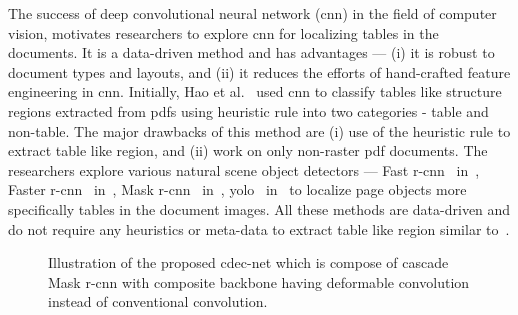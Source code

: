 \documentclass[a4paper,conference]{IEEEtran}
\begin{document}
The success of deep convolutional neural network ({\sc cnn}) in the field of computer vision, motivates researchers to explore {\sc cnn} for localizing tables in the documents. It is a data-driven method and has advantages --- (i) it is robust to document types and layouts, and (ii) it reduces the efforts of hand-crafted feature engineering in {\sc cnn}. Initially, Hao et al.~\cite{hao2016table} used {\sc cnn} to classify tables like structure regions extracted from {\sc pdf}s using heuristic rule into two categories - table and non-table. The major drawbacks of this method are (i) use of the heuristic rule to extract table like region, and (ii) work on only non-raster {\sc pdf} documents. The researchers explore various natural scene object detectors --- Fast {\sc r-cnn}~\cite{girshick2015fast} in~\cite{vo2018ensemble}, Faster {\sc r-cnn}~\cite{ren2015faster} in~\cite{gilani2017table,schreiber2017deepdesrt,siddiqui2018decnt,vo2018ensemble,arif2018table,li2019tablebank,sun2019faster,younas2019ffd,zhong2019publaynet}, Mask {\sc r-cnn}~\cite{he2017mask} in~\cite{younas2019ffd,saha2019graphical,zhong2019publaynet,casado2019benefits}, {\sc yolo}~\cite{redmon2016you} in~\cite{casado2019benefits} to localize page objects more specifically tables in the document images. All these methods are  data-driven and do not require any heuristics or meta-data to extract table like region similar to~\cite{hao2016table}.  

\begin{figure*}[ht!]
\centerline{
}
\caption{Illustration of the proposed {\sc cd}e{\sc c-n}et which is compose of cascade Mask {\sc r-cnn} with composite backbone having deformable convolution instead of conventional convolution. \label{fig:final_architecture}}
\end{figure*}
\end{document}
